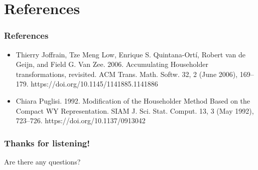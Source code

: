 \documentclass[12pt,aspectratio=169]{beamer}
\begin{document}
    \section{References}
    \begin{frame}
        \frametitle{References}
        \begin{itemize}
            \item Thierry Joffrain, Tze Meng Low, Enrique S. Quintana-Ortí, Robert van de Geijn, and Field G. Van Zee. 2006. Accumulating Householder transformations, revisited. ACM Trans. Math. Softw. 32, 2 (June 2006), 169–179. https://doi.org/10.1145/1141885.1141886
            \item Chiara Puglisi. 1992. Modification of the Householder Method Based on the Compact WY Representation. SIAM J. Sci. Stat. Comput. 13, 3 (May 1992), 723–726. https://doi.org/10.1137/0913042
        \end{itemize}
    \end{frame}
    \begin{frame}
        \frametitle{Thanks for listening!}
        Are there any questions?
    \end{frame}
\end{document}
